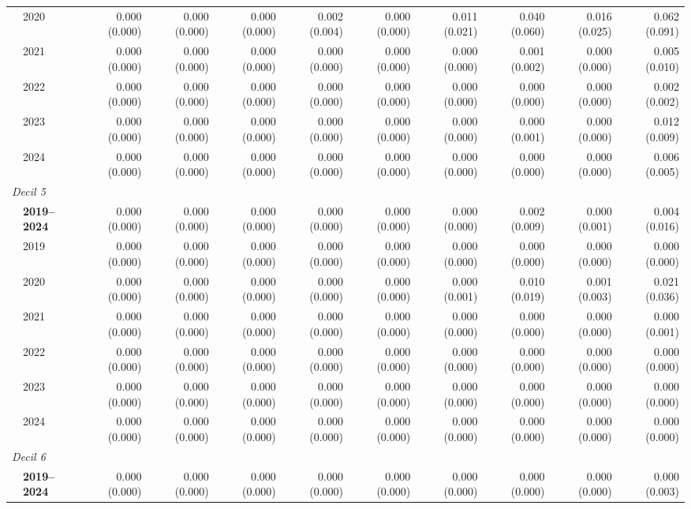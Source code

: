 \begin{table}[htbp]
\begin{tabular}{llrrrrrrrrr}
 & 2020 & 0.000 (0.000) & 0.000 (0.000) & 0.000 (0.000) & 0.002 (0.004) & 0.000 (0.000) & 0.011 (0.021) & 0.040 (0.060) & 0.016 (0.025) & 0.062 (0.091) \\
 & 2021 & 0.000 (0.000) & 0.000 (0.000) & 0.000 (0.000) & 0.000 (0.000) & 0.000 (0.000) & 0.000 (0.000) & 0.001 (0.002) & 0.000 (0.000) & 0.005 (0.010) \\
 & 2022 & 0.000 (0.000) & 0.000 (0.000) & 0.000 (0.000) & 0.000 (0.000) & 0.000 (0.000) & 0.000 (0.000) & 0.000 (0.000) & 0.000 (0.000) & 0.002 (0.002) \\
 & 2023 & 0.000 (0.000) & 0.000 (0.000) & 0.000 (0.000) & 0.000 (0.000) & 0.000 (0.000) & 0.000 (0.000) & 0.000 (0.001) & 0.000 (0.000) & 0.012 (0.009) \\
 & 2024 & 0.000 (0.000) & 0.000 (0.000) & 0.000 (0.000) & 0.000 (0.000) & 0.000 (0.000) & 0.000 (0.000) & 0.000 (0.000) & 0.000 (0.000) & 0.006 (0.005) \\
\midrule
\multicolumn{11}{l}{\textit{Decil 5}} \\
 & \textbf{2019–2024} & 0.000 (0.000) & 0.000 (0.000) & 0.000 (0.000) & 0.000 (0.000) & 0.000 (0.000) & 0.000 (0.000) & 0.002 (0.009) & 0.000 (0.001) & 0.004 (0.016) \\
 & 2019 & 0.000 (0.000) & 0.000 (0.000) & 0.000 (0.000) & 0.000 (0.000) & 0.000 (0.000) & 0.000 (0.000) & 0.000 (0.000) & 0.000 (0.000) & 0.000 (0.000) \\
 & 2020 & 0.000 (0.000) & 0.000 (0.000) & 0.000 (0.000) & 0.000 (0.000) & 0.000 (0.000) & 0.000 (0.001) & 0.010 (0.019) & 0.001 (0.003) & 0.021 (0.036) \\
 & 2021 & 0.000 (0.000) & 0.000 (0.000) & 0.000 (0.000) & 0.000 (0.000) & 0.000 (0.000) & 0.000 (0.000) & 0.000 (0.000) & 0.000 (0.000) & 0.000 (0.001) \\
 & 2022 & 0.000 (0.000) & 0.000 (0.000) & 0.000 (0.000) & 0.000 (0.000) & 0.000 (0.000) & 0.000 (0.000) & 0.000 (0.000) & 0.000 (0.000) & 0.000 (0.000) \\
 & 2023 & 0.000 (0.000) & 0.000 (0.000) & 0.000 (0.000) & 0.000 (0.000) & 0.000 (0.000) & 0.000 (0.000) & 0.000 (0.000) & 0.000 (0.000) & 0.000 (0.000) \\
 & 2024 & 0.000 (0.000) & 0.000 (0.000) & 0.000 (0.000) & 0.000 (0.000) & 0.000 (0.000) & 0.000 (0.000) & 0.000 (0.000) & 0.000 (0.000) & 0.000 (0.000) \\
\midrule
\multicolumn{11}{l}{\textit{Decil 6}} \\
 & \textbf{2019–2024} & 0.000 (0.000) & 0.000 (0.000) & 0.000 (0.000) & 0.000 (0.000) & 0.000 (0.000) & 0.000 (0.000) & 0.000 (0.000) & 0.000 (0.000) & 0.000 (0.003) \\

\end{tabular}
\end{table}
